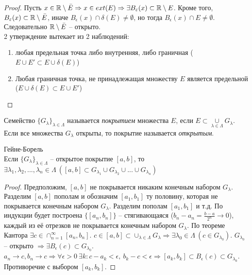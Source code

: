     \begin{proof}
        Пусть $x \in \mathbb{R} \setminus \bar{E} \Rightarrow x \in ext(E) \Rightarrow \exists B_{\varepsilon}(x) \subset \mathbb{R} \setminus E$.
        Кроме того, $B_{\varepsilon}(x) \subset \mathbb{R} \setminus \bar{E}$, иначе $B_{\epsilon}(x) \cap \delta (E) \neq \emptyset$, но тогда $B_{\epsilon}(x) \cap E \neq \emptyset$.
        Следовательно $\mathbb{R} \setminus \bar{E}$ -- открыто.\\
        2 утверждение вытекает из 2 наблюдений:
        \begin{enumerate}
            \item любая предельная точка либо внутренняя, либо граничная ($E \cup E' \subset E \cup \delta (E)$)
            \item Любая граничная точка, не принадлежащая множеству $E$ является предельной ($E \cup \delta (E) \subset E \cup E'$)
        \end{enumerate}
    \end{proof}
    
    \begin{definition}
        Семейство $\{G_{\lambda}\}_{\lambda \in \Lambda}$ называется \textit{покрытием} множества $E$, если $E \subset \underset{\lambda \in \Lambda}{\cup} G_{\lambda}$. Если все множества $G_{\lambda}$ открыты, то покрытие называется \textit{открытым}.
    \end{definition}
    
    \begin{theorem}{Гейне-Борель}\\
        Если $\{G_{\lambda}\}_{\lambda \in \Lambda}$ -- открытое покрытие $[a, b]$, то $\exists\lambda_1, \lambda_2, ..., \lambda_n \in \Lambda \  ([a, b] \subset G_{\lambda_1} \cup G_{\lambda_2} \cup ... \cup G_{\lambda_n})$
    \end{theorem}

    \begin{proof}
        Предположим, $[a, b]$ не покрывается никаким конечным набором $G_{\lambda}$.
        Разделим $[a, b]$ пополам и обозначим $[a_1, b_1]$ ту половину, которая не покрывается конечным набором $G_{\lambda}$.
        Разделим пополам $[a_1, b_1]$ и т.д.
        По индукции будет построена $\{[a_{n}, b_{n}]\}$ -- стягивающаяся ($b_n-a_n = \frac{b-a}{2^{n}} \to 0$),
        каждый из её отрезков не покрывается конечным набором $G_{\lambda}$. По теореме Кантора $\exists c \in \cap_{n = 1}^{\infty}[a_n, b_n]$.
        $c \in [a, b] \subset \cup_{\lambda \in \Lambda} G_{\lambda} \Rightarrow \exists \lambda_0 \in \Lambda \ (c \in G_{\lambda_0})$. $G_{\lambda_0}$ -- открыто $\Rightarrow \exists B_{\epsilon}(c) \subset G_{\lambda_0}$.\\
        $a_{n} \to c, b_n \to c \Rightarrow \forall \epsilon > 0 \ \exists k : c - a_{k} < \epsilon, \  b_{k} - c < \epsilon \Rightarrow [a_k, b_k] \subset B_{\epsilon}(c) \subset G_{\lambda_0}$. Противоречие с выбором $[a_k, b_k]$.
    \end{proof}